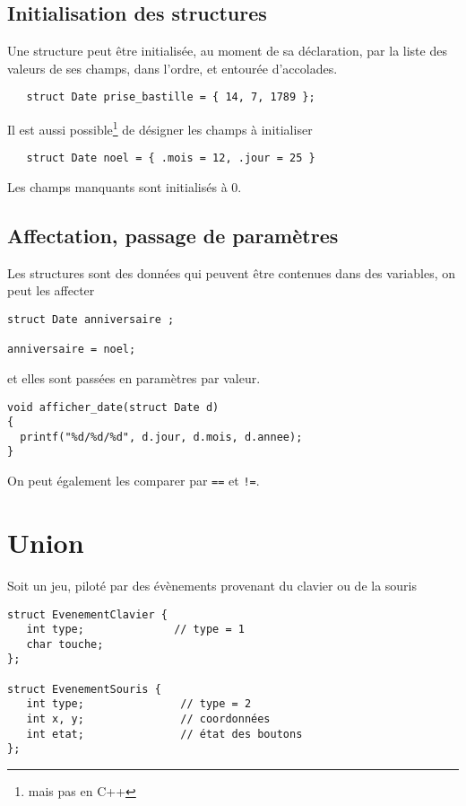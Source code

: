 \documentclass[10pt]{article}
\begin{document}
\subsection{Initialisation des structures}

Une structure peut être initialisée, au moment de sa déclaration, par la liste
des valeurs de ses champs, dans l'ordre, et entourée d'accolades.

\begin{verbatim}
   struct Date prise_bastille = { 14, 7, 1789 };
\end{verbatim}

Il est aussi possible\footnote{mais pas en C++} de désigner 
les champs à initialiser 
\begin{verbatim}
   struct Date noel = { .mois = 12, .jour = 25 }
\end{verbatim}

Les champs manquants sont initialisés à 0.


\subsection{Affectation, passage de paramètres}

Les structures sont des données qui peuvent être contenues 
dans des variables, on peut les affecter
\begin{verbatim}
struct Date anniversaire ;

anniversaire = noel;
\end{verbatim}
et elles sont passées en paramètres par valeur.

\begin{verbatim}
void afficher_date(struct Date d)
{
  printf("%d/%d/%d", d.jour, d.mois, d.annee);
}
\end{verbatim}

On peut également les comparer par \texttt{==} et \texttt{!=}.


\section{Union}

Soit un jeu, piloté par des évènements provenant du
clavier ou de la souris
\begin{verbatim}
struct EvenementClavier {
   int type;              // type = 1
   char touche;          
};

struct EvenementSouris {
   int type;               // type = 2 
   int x, y;               // coordonnées
   int etat;               // état des boutons  
};
\end{verbatim}
\end{document}
